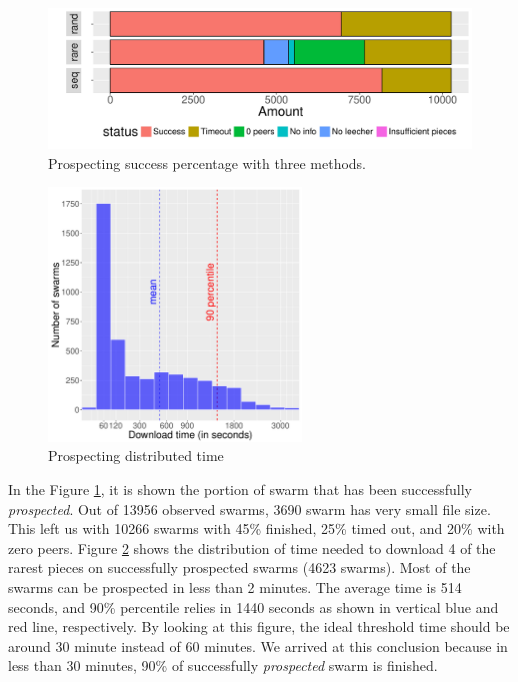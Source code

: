 \begin{figure}[h]
	\centering
	\includegraphics[width=\textwidth]{pics/results/dpredown_merge.pdf}
	\caption{Prospecting success percentage with three methods.}
	\label{fig:predownprecent}
\end{figure}

\begin{figure}[h]
	\centering
	\includegraphics[width=0.6\textwidth]{pics/results/hpredown.pdf}
	\caption{Prospecting distributed time}
	\label{fig:predownhist}
\end{figure}

In the Figure \ref{fig:predownprecent}, it is shown the portion of swarm that has been successfully \textit{prospected}. Out of 13956 observed swarms, 3690 swarm has very small file size. This left us with 10266 swarms with 45\% finished, 25\% timed out, and 20\% with zero peers. Figure \ref{fig:predownhist} shows the distribution of time needed to download 4 of the rarest pieces on successfully prospected swarms (4623 swarms). Most of the swarms can be prospected in less than 2 minutes. The average time is 514 seconds, and 90\% percentile relies in 1440 seconds as shown in vertical blue and red line, respectively. By looking at this figure, the ideal threshold time should be around 30 minute instead of 60 minutes. We arrived at this conclusion because in less than 30 minutes, 90\% of successfully \textit{prospected} swarm is finished.


